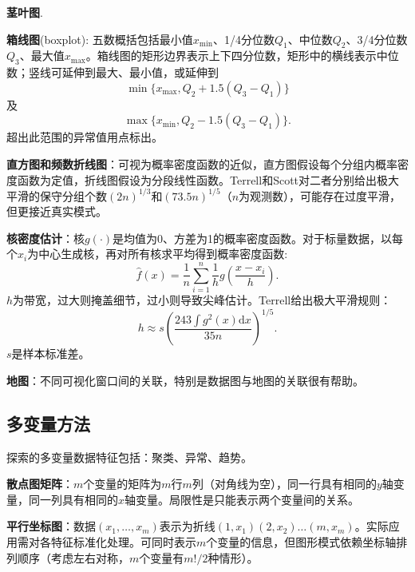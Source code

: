 \par \textbf{茎叶图}.
\par \textbf{箱线图}(boxplot): 五数概括包括最小值$x_{\min}$、1/4分位数$Q_1$、中位数$Q_2$、3/4分位数$Q_3$、最大值$x_{\max}$。箱线图的矩形边界表示上下四分位数，矩形中的横线表示中位数；竖线可延伸到最大、最小值，或延伸到
\begin{equation}
    \min \{x_{\max}, Q_2+1.5(Q_3-Q_1)\}
\end{equation}
及
\begin{equation}
    \max \{x_{\min}, Q_2-1.5(Q_3-Q_1)\}.
\end{equation}
超出此范围的异常值用点标出。

\par\textbf{直方图和频数折线图}：可视为概率密度函数的近似，直方图假设每个分组内概率密度函数为定值，折线图假设为分段线性函数。Terrell和Scott对二者分别给出极大平滑的保守分组个数$(2n)^{1/3}$和$(73.5n)^{1/5}$（$n$为观测数），可能存在过度平滑，但更接近真实模式。

\par \textbf{核密度估计}：核$g(\cdot)$是均值为0、方差为1的概率密度函数。对于标量数据，以每个$x_i$为中心生成核，再对所有核求平均得到概率密度函数:
\begin{equation}
    \hat{f}(x)=\frac{1}{n}\sum_{i=1}^n \frac{1}{h}g\left(\frac{x-x_i}{h}\right).
\end{equation}
$h$为带宽，过大则掩盖细节，过小则导致尖峰估计。Terrell给出极大平滑规则：
\begin{equation}
    h \approx s\left(\frac{243\int g^2(x)\text{d} x}{35n}\right)^{1/5}.
\end{equation}
$s$是样本标准差。

\par \textbf{地图}：不同可视化窗口间的关联，特别是数据图与地图的关联很有帮助。

\subsection{多变量方法}

\par 探索的多变量数据特征包括：聚类、异常、趋势。

\par \textbf{散点图矩阵}：$m$个变量的矩阵为$m$行$m$列（对角线为空），同一行具有相同的$y$轴变量，同一列具有相同的$x$轴变量。局限性是只能表示两个变量间的关系。

\par \textbf{平行坐标图}：数据$(x_1,\dots,x_m)$表示为折线$(1,x_1)(2,x_2)\dots(m,x_m)$。实际应用需对各特征标准化处理。可同时表示$m$个变量的信息，但图形模式依赖坐标轴排列顺序（考虑左右对称，$m$个变量有$m!/2$种情形）。

